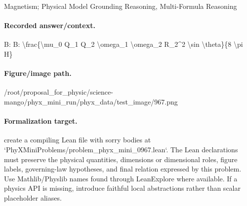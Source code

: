 Magnetism; Physical Model Grounding Reasoning, Multi-Formula Reasoning

\paragraph{Recorded answer/context.}
B: B: \textbackslash{}frac\{\textbackslash{}mu\_0 Q\_1 Q\_2 \textbackslash{}omega\_1 \textbackslash{}omega\_2 R\_2\textasciicircum{}2 \textbackslash{}sin \textbackslash{}theta\}\{8 \textbackslash{}pi H\}

\paragraph{Figure/image path.}
/root/proposal\_for\_physic/science-mango/phyx\_mini\_run/phyx\_data/test\_image/967.png

\paragraph{Formalization target.}
create a compiling Lean file with sorry bodies at `PhyXMiniProblems/problem\_phyx\_mini\_0967.lean`. The Lean declarations must preserve the physical quantities, dimensions or dimensional roles, figure labels, governing-law hypotheses, and final relation expressed by this problem.
Use Mathlib/Physlib names found through LeanExplore where available. If a physics API is missing, introduce faithful local abstractions rather than scalar placeholder aliases.

